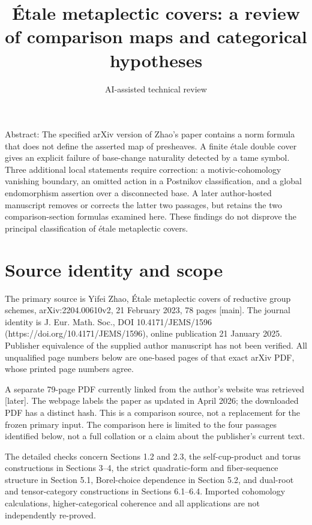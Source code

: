 \documentclass[10pt]{article}
\title{Étale metaplectic covers: a review of comparison maps and categorical hypotheses}
\author{AI-assisted technical review}
\date{}
\begin{document}
\maketitle
Abstract: The specified arXiv version of Zhao’s paper contains a norm formula that does not define the asserted map of presheaves. A finite étale double cover gives an explicit failure of base-change naturality detected by a tame symbol. Three additional local statements require correction: a motivic-cohomology vanishing boundary, an omitted action in a Postnikov classification, and a global endomorphism assertion over a disconnected base. A later author-hosted manuscript removes or corrects the latter two passages, but retains the two comparison-section formulas examined here. These findings do not disprove the principal classification of étale metaplectic covers.\par
\section*{Source identity and scope}
The primary source is Yifei Zhao, Étale metaplectic covers of reductive group schemes, arXiv:2204.00610v2, 21 February 2023, 78 pages [main]. The journal identity is J. Eur. Math. Soc., DOI 10.4171/JEMS/1596 (https://doi.org/10.4171/JEMS/1596), online publication 21 January 2025. Publisher equivalence of the supplied author manuscript has not been verified. All unqualified page numbers below are one-based pages of that exact arXiv PDF, whose printed page numbers agree.\par
A separate 79-page PDF currently linked from the author’s website was retrieved [later]. The webpage labels the paper as updated in April 2026; the downloaded PDF has a distinct hash. This is a comparison source, not a replacement for the frozen primary input. The comparison here is limited to the four passages identified below, not a full collation or a claim about the publisher’s current text.\par
The detailed checks concern Sections 1.2 and 2.3, the self-cup-product and torus constructions in Sections 3–4, the strict quadratic-form and fiber-sequence structure in Section 5.1, Borel-choice dependence in Section 5.2, and dual-root and tensor-category constructions in Sections 6.1–6.4. Imported cohomology calculations, higher-categorical coherence and all applications are not independently re-proved.\par
\end{document}
